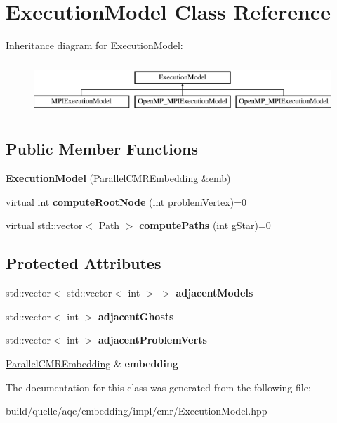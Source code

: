 \hypertarget{a00054}{}\section{Execution\+Model Class Reference}
\label{a00054}
Inheritance diagram for Execution\+Model\+:\begin{figure}[H]
\begin{center}
\leavevmode
\includegraphics[height=1.975309cm]{a00054}
\end{center}
\end{figure}
\subsection*{Public Member Functions}
\begin{DoxyCompactItemize}
\item 
{\bfseries Execution\+Model} (\hyperlink{a00092}{Parallel\+C\+M\+R\+Embedding} \&emb)\hypertarget{a00054_a21c52f721b0b94d2729b63ab9bdaa960}{}\label{a00054_a21c52f721b0b94d2729b63ab9bdaa960}

\item 
virtual int {\bfseries compute\+Root\+Node} (int problem\+Vertex)=0\hypertarget{a00054_a1934dabaaea4ec5ef2724386455dc5b8}{}\label{a00054_a1934dabaaea4ec5ef2724386455dc5b8}

\item 
virtual std\+::vector$<$ Path $>$ {\bfseries compute\+Paths} (int g\+Star)=0\hypertarget{a00054_a316ba5002335237f8d4c5ceed798c3e8}{}\label{a00054_a316ba5002335237f8d4c5ceed798c3e8}

\end{DoxyCompactItemize}
\subsection*{Protected Attributes}
\begin{DoxyCompactItemize}
\item 
std\+::vector$<$ std\+::vector$<$ int $>$ $>$ {\bfseries adjacent\+Models}\hypertarget{a00054_a754c7a96930bd04e932303f2a99c86a9}{}\label{a00054_a754c7a96930bd04e932303f2a99c86a9}

\item 
std\+::vector$<$ int $>$ {\bfseries adjacent\+Ghosts}\hypertarget{a00054_a35796743fbab23f8a9feedb823774639}{}\label{a00054_a35796743fbab23f8a9feedb823774639}

\item 
std\+::vector$<$ int $>$ {\bfseries adjacent\+Problem\+Verts}\hypertarget{a00054_adaca100d7732c37639dc127386139df2}{}\label{a00054_adaca100d7732c37639dc127386139df2}

\item 
\hyperlink{a00092}{Parallel\+C\+M\+R\+Embedding} \& {\bfseries embedding}\hypertarget{a00054_a91a42038ba365fafa1cce719f1744886}{}\label{a00054_a91a42038ba365fafa1cce719f1744886}

\end{DoxyCompactItemize}


The documentation for this class was generated from the following file\+:\begin{DoxyCompactItemize}
\item 
build/quelle/aqc/embedding/impl/cmr/\+Execution\+Model.\+hpp\end{DoxyCompactItemize}
